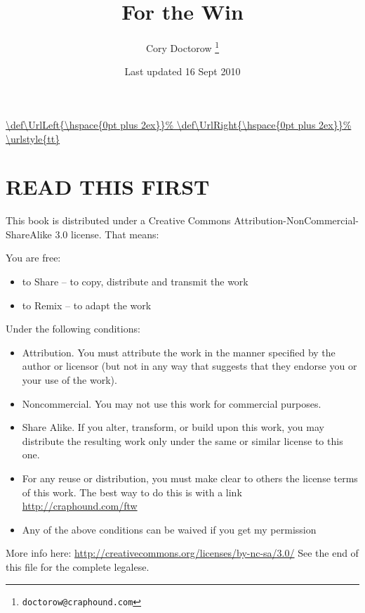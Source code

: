 \usepackage{url}
\DeclareUrlCommand\url{\def\UrlLeft{\hspace{0pt plus 2ex}}%
        \def\UrlRight{\hspace{0pt plus 2ex}}%
        \urlstyle{tt}}




\newcommand{\shopad}[2]{
  \emph{#1}
  \par\smallskip\noindent
  \emph{#2}
  \par\medskip\noindent}

\newcommand{\tb}{
\begin{center}
\#
\end{center}
}

\newcommand\edialog[1]{
{
  \setlength\parindent{0pt}
  \setlength\hangindent{10pt}
  \raggedright
  \textgreater\ \texttt{#1}
  \par
}}



\raggedbottom
\frontmatter

\title{For the Win}
\author{Cory Doctorow
\thanks{\texttt{doctorow@craphound.com}}}
\date{Last updated 16 Sept 2010}

\maketitle

\section{READ THIS FIRST}

This book is distributed under a Creative Commons
Attribution-NonCommercial-ShareAlike 3.0 license. That means:

You are free:

\begin{itemize}
\item 
  to Share -- to copy, distribute and transmit the work
\item 
  to Remix -- to adapt the work
\end{itemize}
Under the following conditions:
\begin{itemize}
\item 
  Attribution. You must attribute the work in the manner specified by
  the author or licensor (but not in any way that suggests that they
  endorse you or your use of the work).
\item 
  Noncommercial. You may not use this work for commercial purposes.
\item 
  Share Alike. If you alter, transform, or build upon this work, you
  may distribute the resulting work only under the same or similar
  license to this one.
\item 
  For any reuse or distribution, you must make clear to others the
  license terms of this work. The best way to do this is with a link
  \url{http://craphound.com/ftw}
\item 
  Any of the above conditions can be waived if you get my permission
\end{itemize}
More info here:
\url{http://creativecommons.org/licenses/by-nc-sa/3.0/}
See the end of this file for the complete legalese.

